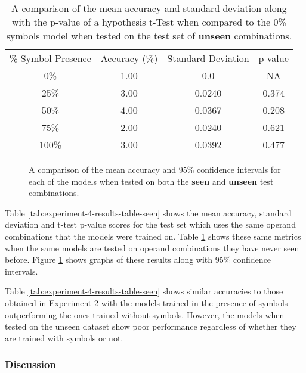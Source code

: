 \begin{table}[p!]
	\center
	\caption{A comparison of the mean accuracy and standard deviation along with the p-value of a hypothesis t-Test when compared to the 0\% symbols model when tested on the test set of \textbf{unseen} combinations.}
	\label{tab:experiment-4-results-table-unseen}
	\begin{tabular}{ |c|c|c|c| } 
		\hline
		\% Symbol Presence & Accuracy (\%) & Standard Deviation  & p-value\\ 
		0\% & 1.00 & 0.0 & NA \\  
		25\% & 3.00 & 0.0240 & 0.374\\  
		50\% & 4.00 & 0.0367 & 0.208 \\  
		75\% & 2.00 & 0.0240 & 0.621\\  
		100\% & 3.00 & 0.0392 & 0.477\\  
		\hline
	\end{tabular}
\end{table}

\begin{figure}[p!]%
	\centering
	\caption{A comparison of the mean accuracy and 95\% confidence intervals for each of the models when tested on both the \textbf{seen} and \textbf{unseen} test combinations.}
	\label{fig:experiment-4-results-chart}
\end{figure}

Table \ref{tab:experiment-4-results-table-seen} shows the mean accuracy, standard deviation and t-test p-value scores for the test set which uses the same operand combinations that the models were trained on. Table \ref{tab:experiment-4-results-table-unseen} shows these same metrics when the same models are tested on operand combinations they have never seen before. Figure \ref{fig:experiment-4-results-chart} shows graphs of these results along with 95\% confidence intervals.

Table \ref{tab:experiment-4-results-table-seen} shows similar accuracies to those obtained in Experiment 2 with the models trained in the presence of symbols outperforming the ones trained without symbols. However, the models when tested on the unseen dataset show poor performance regardless of whether they are trained with symbols or not.

\subsubsection{Discussion}


